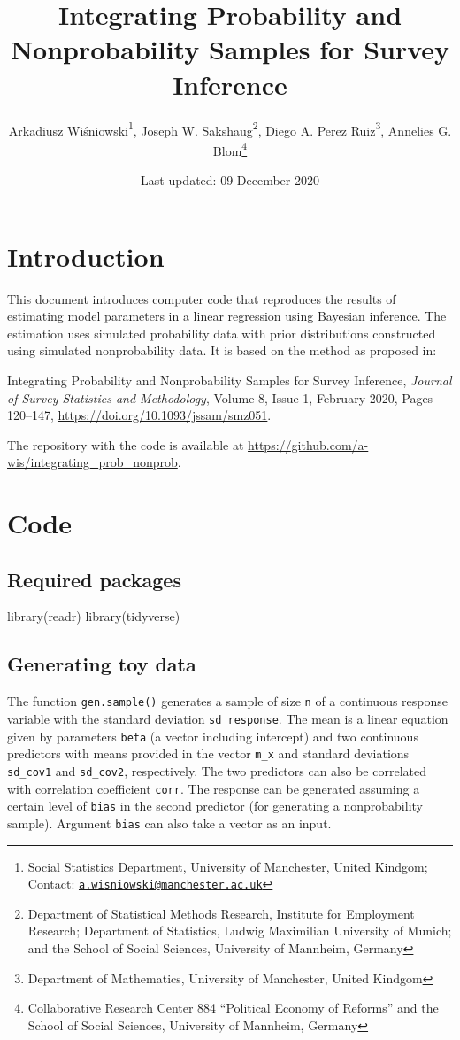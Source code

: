 \documentclass[
]{article}
\title{Integrating Probability and Nonprobability Samples for Survey
Inference}
\author{Arkadiusz Wiśniowski\footnote{Social Statistics Department,
  University of Manchester, United Kindgom; Contact:
  \href{mailto:a.wisniowski@manchester.ac.uk}{\nolinkurl{a.wisniowski@manchester.ac.uk}}},
Joseph W. Sakshaug\footnote{Department of Statistical Methods Research,
  Institute for Employment Research; Department of Statistics, Ludwig
  Maximilian University of Munich; and the School of Social Sciences,
  University of Mannheim, Germany}, Diego A. Perez Ruiz\footnote{Department
  of Mathematics, University of Manchester, United Kindgom}, Annelies G.
Blom\footnote{Collaborative Research Center 884 ``Political Economy of
  Reforms'' and the School of Social Sciences, University of Mannheim,
  Germany}}
\date{Last updated: 09 December 2020}
\newenvironment{Shaded}{\begin{snugshade}}{\end{snugshade}}
\newcommand{\FunctionTok}[1]{\textcolor[rgb]{0.00,0.00,0.00}{#1}}
\newcommand{\NormalTok}[1]{#1}
\begin{document}
\maketitle

\hypertarget{introduction}{%
\section{Introduction}\label{introduction}}

This document introduces computer code that reproduces the results of
estimating model parameters in a linear regression using Bayesian
inference. The estimation uses simulated probability data with prior
distributions constructed using simulated nonprobability data. It is
based on the method as proposed in:

Integrating Probability and Nonprobability Samples for Survey Inference,
\emph{Journal of Survey Statistics and Methodology}, Volume 8, Issue 1,
February 2020, Pages 120--147,
\url{https://doi.org/10.1093/jssam/smz051}.

The repository with the code is available at
\url{https://github.com/a-wis/integrating_prob_nonprob}.

\hypertarget{code}{%
\section{Code}\label{code}}

\hypertarget{required-packages}{%
\subsection{Required packages}\label{required-packages}}

\begin{Shaded}
\begin{Highlighting}[]
\FunctionTok{library}\NormalTok{(readr)}
\FunctionTok{library}\NormalTok{(tidyverse)}
\end{Highlighting}
\end{Shaded}

\hypertarget{generating-toy-data}{%
\subsection{Generating toy data}\label{generating-toy-data}}

The function \texttt{gen.sample()} generates a sample of size \texttt{n}
of a continuous response variable with the standard deviation
\texttt{sd\_response}. The mean is a linear equation given by parameters
\texttt{beta} (a vector including intercept) and two continuous
predictors with means provided in the vector \texttt{m\_x} and standard
deviations \texttt{sd\_cov1} and \texttt{sd\_cov2}, respectively. The
two predictors can also be correlated with correlation coefficient
\texttt{corr}. The response can be generated assuming a certain level of
\texttt{bias} in the second predictor (for generating a nonprobability
sample). Argument \texttt{bias} can also take a vector as an input.
\end{document}
